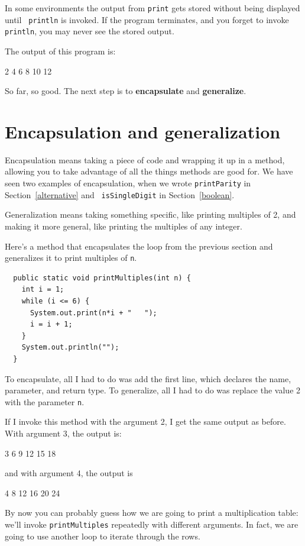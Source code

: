 \documentclass[12pt]{book}
\theoremstyle{exercise}
\begin{document}

In some environments the
output from {\tt print} gets stored without being displayed until {\tt
println} is invoked.  If the program terminates, and you forget to
invoke {\tt println}, you may never see the stored output.

The output of this program is:

\begin{verbatimtab}
2   4   6   8   10   12
\end{verbatimtab}
%
So far, so good.  The next step is to {\bf encapsulate} and {\bf
generalize}.


\section {Encapsulation and generalization}
\label{encapsulation}

Encapsulation means taking a piece of code and wrapping it up
in a method, allowing you to take advantage of all the things methods
are good for.  We have seen two examples of encapsulation, when we
wrote {\tt printParity} in Section~\ref{alternative} and {\tt
isSingleDigit} in Section~\ref{boolean}.

Generalization means taking something specific, like printing
multiples of 2, and making it more general, like printing the
multiples of any integer.

Here's a method that encapsulates the loop from the previous
section and generalizes it to print multiples of {\tt n}.

\begin{lstlisting}
  public static void printMultiples(int n) {
    int i = 1;
    while (i <= 6) {
      System.out.print(n*i + "   ");
      i = i + 1;
    }
    System.out.println("");
  }
\end{lstlisting}
%
To encapsulate, all I had to do was add the first line,
which declares the name, parameter,
and return type.  To generalize, all I had to do was replace
the value 2 with the parameter {\tt n}.

If I invoke this method with the argument 2, I get the same
output as before.  With argument 3, the output is:

\begin{verbatimtab}
3   6   9   12   15   18
\end{verbatimtab}
%
and with argument 4, the output is

\begin{verbatimtab}
4   8   12   16   20   24
\end{verbatimtab}
%
By now you can probably guess how we are going to print a
multiplication table: we'll invoke {\tt printMultiples} repeatedly with
different arguments.  In fact, we are going to use another loop to
iterate through the rows.
\end{document}
